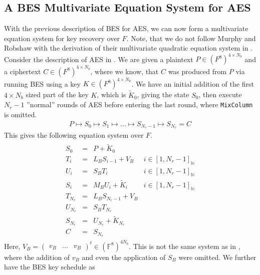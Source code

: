 \subsection{A BES Multivariate Equation System for AES }

With the previous description of BES for AES, we can now form a multivariate equation system for key recovery over \(F\). Note, that we do not follow Murphy and Robshaw with the derivation of their multivariate quadratic equation system in \cite[pp. 11-13]{Murphy2002}. Consider the description of AES in . We are given a plaintext \(P \in (F^8)^{4 \times N_b}\) and a ciphertext \(C \in (F^8)^{4 \times N_b}\), where we know, that \(C\) was produced from \(P\) via running BES using a key \(K \in (F^8)^{4 \times N_k}\). We have an initial addition of the first \(4 \times N_b\) sized part of the key \(K\), which is \(\tilde{K}_0\), giving the state \(S_0\), then execute \(N_r-1\) ''normal'' rounds of AES before entering the last round, where \texttt{MixColumn} is omitted.
\begin{align}
    P \mapsto S_0 \mapsto S_1 \mapsto ... \mapsto S_{N_r-1} \mapsto S_{N_r} = C
\end{align}
This gives the following equation system over \(F\).
\begin{align}
    \begin{array}{rcll}
        S_0     &=& P + \tilde{K}_0\\
        T_i     &=& L_B S_{i-1} + V_B            & i \in [1, N_r-1]_{\mathbb{N}}\\
        U_i     &=& S_B T_i                      & i \in [1, N_r-1]_{\mathbb{N}}\\
        S_i     &=& M_B U_i + \tilde{K}_i        & i \in [1, N_r-1]_{\mathbb{N}}\\
        T_{N_r} &=& L_B S_{N_r-1} + V_B\\
        U_{N_r} &=& S_B T_{N_r}\\
        S_{N_r} &=& U_{N_r} + \tilde{K}_{N_r}\\
        C       &=& S_{N_r}
    \end{array}
\end{align}
Here, \(V_B = \begin{pmatrix}
    v_B & ... & v_B
\end{pmatrix}^t \in (\mathbb{F}^8)^{4N_b}\). This is not the same system as in \cite[pp. 11-13]{Murphy2002}, where the addition of \(v_B\) and even the application of \(S_B\) were omitted. We further have the BES key schedule as
